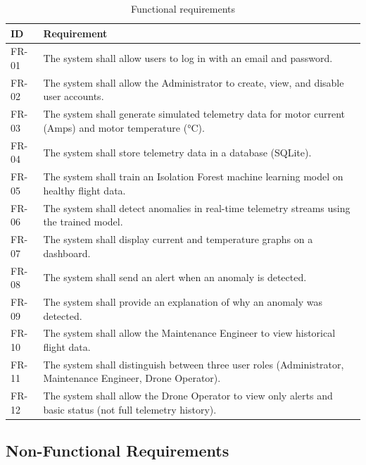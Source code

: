 \begin{table}[H]
\centering
\caption{Functional requirements}
\begin{tabular}{|p{1.5cm}|p{10cm}|}
\hline
\textbf{ID} & \textbf{Requirement} \\
\hline
FR-01 & The system shall allow users to log in with an email and password. \\
\hline
FR-02 & The system shall allow the Administrator to create, view, and disable user accounts. \\
\hline
FR-03 & The system shall generate simulated telemetry data for motor current (Amps) and motor temperature (°C). \\
\hline
FR-04 & The system shall store telemetry data in a database (SQLite). \\
\hline
FR-05 & The system shall train an Isolation Forest machine learning model on healthy flight data. \\
\hline
FR-06 & The system shall detect anomalies in real-time telemetry streams using the trained model. \\
\hline
FR-07 & The system shall display current and temperature graphs on a dashboard. \\
\hline
FR-08 & The system shall send an alert when an anomaly is detected. \\
\hline
FR-09 & The system shall provide an explanation of why an anomaly was detected. \\
\hline
FR-10 & The system shall allow the Maintenance Engineer to view historical flight data. \\
\hline
FR-11 & The system shall distinguish between three user roles (Administrator, Maintenance Engineer, Drone Operator). \\
\hline
FR-12 & The system shall allow the Drone Operator to view only alerts and basic status (not full telemetry history). \\
\hline
\end{tabular}
\end{table}

\subsection{Non-Functional Requirements}

